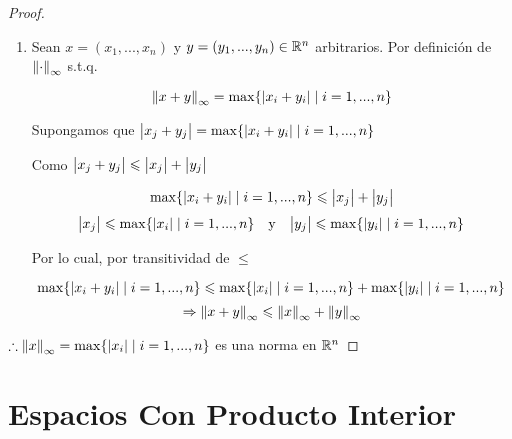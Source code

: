 \begin{proof}
\begin{enumerate}[label=(\subscript{N}{{\arabic*}})]
\begin{enumerate}
\end{enumerate}

\item Sean $x=(x_1,...,x_n)$ y $y=(y_1,...,y_n) \in \mathbb{R}^n$ arbitrarios. Por definición de ${\norm{ \cdot}}_{\infty}$ s.t.q.

\begin{equation*}
    {\norm{ x+y}}_{\infty} = \max \{ \abs{{x}_{i}+{y}_{i}} \mid i = 1,...,n\}
\end{equation*}

Supongamos que $\abs{x_j + y_j} = \max \{ \abs{{x}_{i}+{y}_{i}} \mid i = 1,...,n\}$

Como $\abs{x_j + y_j} \leqslant \abs{x_j} + \abs{y_j}$

\begin{equation*}
    \max \{ \abs{{x}_{i}+{y}_{i}} \mid i = 1,...,n\} \leqslant \abs{x_j} + \abs{y_j}
\end{equation*}
\begin{align*}
        \abs{x_j} \leqslant \max \{ \abs{{x}_{i}} \mid i = 1,...,n\} & & \text{y} & & \abs{y_j} \leqslant \max \{ \abs{{y}_{i}} \mid i = 1,...,n\}
\end{align*}

Por lo cual, por transitividad de $\leqslant$

\begin{equation*}
    \max \{ \abs{{x}_{i}+{y}_{i}} \mid i = 1,...,n\} \leqslant \max \{ \abs{{x}_{i}} \mid i = 1,...,n\} + \max \{ \abs{{y}_{i}} \mid i = 1,...,n\} 
\end{equation*}
\begin{equation*}
    \Rightarrow {\norm{ x+y}}_{\infty} \leqslant  {\norm{x}}_{\infty} +  {\norm{y}}_{\infty}
\end{equation*}
\end{enumerate}    

$\therefore {\norm{x}}_{\infty} = \max \{ \abs{{x}_{i}} \mid i = 1,...,n\}$ es una norma en $\mathbb{R}^n$
\end{proof}

\section{Espacios Con Producto Interior}

